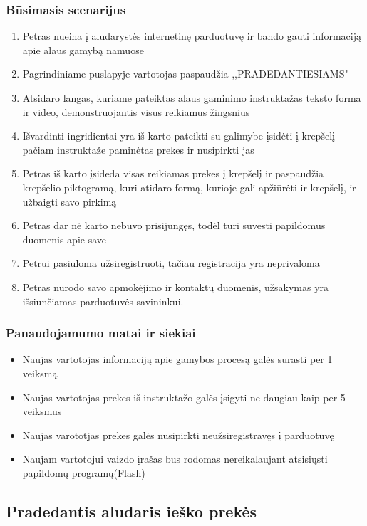 \documentclass[oneside]{VUMIFPSkursinis}
\begin{document}
		\subsubsection{Būsimasis scenarijus}
			\begin{enumerate}
				\item{Petras nueina į aludarystės internetinę parduotuvę ir bando gauti informaciją apie alaus gamybą namuose}
				\item{Pagrindiniame puslapyje vartotojas paspaudžia ,,PRADEDANTIESIAMS"}
				\item{Atsidaro langas, kuriame pateiktas alaus gaminimo instruktažas teksto forma ir video, demonstruojantis visus reikiamus žingsnius}
				\item{Išvardinti ingridientai yra iš karto pateikti su galimybe įsidėti į krepšelį pačiam instruktaže paminėtas prekes ir nusipirkti jas}
				\item{Petras iš karto įsideda visas reikiamas prekes į krepšelį ir paspaudžia krepšelio piktogramą, kuri atidaro formą, kurioje gali apžiūrėti ir krepšelį, ir užbaigti savo pirkimą}
				\item{Petras dar nė karto nebuvo prisijungęs, todėl turi suvesti papildomus duomenis apie save}
				\item{Petrui pasiūloma užsiregistruoti, tačiau registracija yra neprivaloma}
				\item{Petras nurodo savo apmokėjimo ir kontaktų duomenis, užsakymas yra išsiunčiamas parduotuvės savininkui.}
			\end{enumerate}
		\subsubsection{Panaudojamumo matai ir siekiai}
			\begin{itemize}
				\item{Naujas vartotojas informaciją apie gamybos procesą galės surasti per 1 veiksmą}
				\item{Naujas vartotojas prekes iš instruktažo galės įsigyti ne daugiau kaip per 5 veiksmus}
				\item{Naujas varototjas prekes galės nusipirkti neužsiregistravęs į parduotuvę}
				\item{Naujam vartotojui vaizdo įrašas bus rodomas nereikalaujant atsisiųsti papildomų programų(Flash)}
			\end{itemize}

	\subsection{Pradedantis aludaris ieško prekės}
\end{document}
